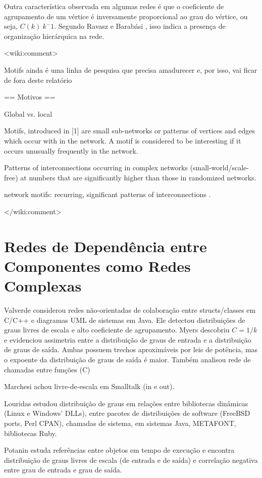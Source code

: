 \documentclass{article}
\begin{document}
Outra característica observada em algumas redes é que o coeficiente de agrupamento de um vértice é inversamente proporcional ao grau do vértice, ou seja, $C(k) ~ k^-1$. Segundo Ravasz e Barabási \cite{Ravasz2003}, isso indica a presença de organização hierárquica na rede.

<wiki:comment>
	\cite{Valverde2005,Ma2008}
	

	Motifs ainda é uma linha de pesquisa que precisa amadurecer e, por isso, vai ficar de fora deste relatório

	== Motivos ==

	Global vs. local

	Motifs,
	introduced in [1] are small sub-networks or patterns of
	vertices and edges which occur with in the network. A
	motif is considered to be interesting if it occurs unusually
	frequently in the network.

	Patterns of interconnections occurring in
	complex networks (small-world/scale-
	free) at numbers that are significantly
	higher than those in randomized
	networks.

	network motifs: recurring, significant patterns of interconnections \cite{Milo2002}.

</wiki:comment>

\section{Redes de Dependência entre Componentes como Redes Complexas}

Valverde \cite{Valverde2003} considerou redes não-orientadas de colaboração entre structs/classes em C/C++ e diagramas UML de sistemas em Java. Ele detectou distribuições de graus livres de escala e alto coeficiente de agrupamento.
Myers \cite{Myers2003} descobriu $C = 1/k$ e evidenciou assimetria entre a distribuição de graus de entrada e a distribuição de graus de saída. Ambas possuem trechos aproximáveis por  leis de potência, mas o expoente da distribuição de graus de saída é maior. Também analisou rede de chamadas entre funções (C)

Marchesi \cite{Marchesi2004} achou livre-de-escala em Smalltalk (in e out).

Louridas \cite{Louridas2008} estudou distribuição de graus em relações entre bibliotecas dinâmicas (Linux e Windows' DLLs), entre pacotes de distribuições de software (FreeBSD ports, Perl CPAN), chamadas de sistema, em sistemas Java, METAFONT, bibliotecas Ruby. 

Potanin \cite{Potanin2005} estuda referências entre objetos em tempo de execução e encontra distribuição de graus livres de escala (de entrada e de saída) e correlação negativa entre grau de entrada e grau de saída.
\end{document}
